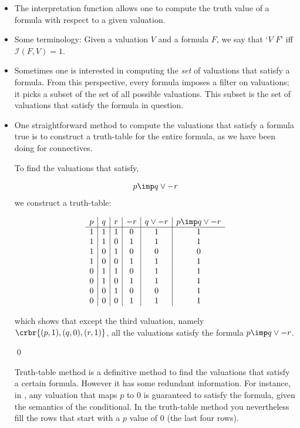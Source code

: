 \documentclass[11pt]{article}
\begin{document}
\begin{itemize}

\item The interpretation function allows one to compute the truth value of a
formula with respect to a given valuation.

\item Some terminology: Given a valuation $V$ and a formula $F$, we say that
`$V$  $F$'
iff $\mathcal{I}(F,V)= 1$. 

\item Sometimes one is interested in computing the \emph{set} of valuations that
satisfy a formula. From this perspective, every formula imposes a filter on valuations; it
picks a subset of the set of all possible valuations. This subset is the set of
valuations that satisfy the formula in question.

\item One straightforward method to compute the valuations that satisfy a formula
true is to construct a truth-table for the entire formula, as we have been doing
for connectives. 

\hrulefill
\begin{uexample}
To find the valuations that satisfy,  

\begin{align}\label{ttex}
p\imp q\lor -r
\end{align}
we construct a truth-table:

\[
\begin{array}{c|c|c|c|c|c}
p & q & r & -r & q\lor -r& p\imp q\lor -r\\ \hline
 1&1 & 1&0 &1 &1 \\
 1&1 & 0&1 &1 &1 \\
 1&0 & 1&0 &0 &0 \\
 1&0 & 0&1 &1 &1 \\
 0&1 & 1&0 &1 &1 \\
 0&1 & 0&1 &1 &1 \\
 0&0 & 1&0 &0 &1 \\
 0&0 & 0&1 &1 &1 
\end{array}
\]

which shows that except the third valuation, namely $\crbr{(p,1),(q,0),(r,1)}$,
all the valuations satisfy the formula $p\imp q\lor -r$.

\qed
\end{uexample}
\hrulefill

Truth-table method is a definitive method to find the valuations that satisfy a
certain formula. However it has some redundant information. For instance, in
, any valuation that maps $p$ to 0 is guaranteed to satisfy the
formula, given the semantics of the conditional. In the truth-table method you
nevertheless fill the rows that start with a $p$ value of 0 (the last four
rows). 


\end{itemize}
\end{document}
